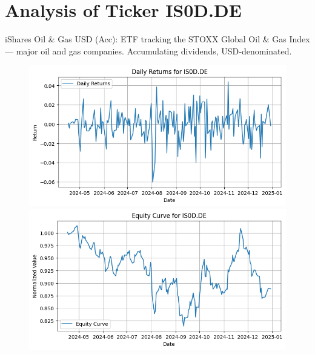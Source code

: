 \documentclass{article}%
\begin{document}
%
\newpage

%
\section*{Analysis of Ticker IS0D.DE}%
\label{sec:AnalysisofTickerIS0D.DE}%
iShares Oil \& Gas USD (Acc): ETF tracking the STOXX Global Oil \& Gas Index — major oil and gas companies. Accumulating dividends, USD‑denominated.%


\begin{figure}[htbp]%
\begin{minipage}{0.49\textwidth}%
\includegraphics[width=\linewidth]{ticker_images/IS0D.DE_daily_returns.png}%
\end{minipage}%
\begin{minipage}{0.49\textwidth}%
\includegraphics[width=\linewidth]{ticker_images/IS0D.DE_equity_curve.png}%
\end{minipage}%
\end{figure}

%
\end{document}

